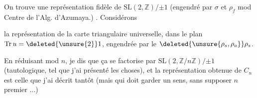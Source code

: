 On trouve une représentation fidèle de $\mathrm{SL}(2,\mathbb Z)/{\pm1}$  (engendré par $\sigma$ et $\rho_f$ mod Centre de l'Alg. d'Azumaya.) . Considérons

 la représentation de la carte triangulaire universelle, dans le plan   $\operatorname{Tr}u=\deleted{\unsure{2}}1$, engendrée par le  $\deleted{\unsure{\rho_s,\rho_a}}\rho_s$. 


En réduisant mod $n$, je dis que ça se factorise par $\mathrm{SL}(2,\mathbb Z/n\mathbb Z)/{\pm1}$ (tautologique, tel que j'ai présenté les choses), et la représentation obtenue de $C_n$ est celle que j'ai décrit tantôt (mais qui doit garder un sens, sans supposer $n$ premier $\ldots$)

